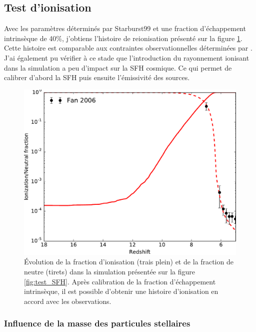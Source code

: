 \clearpage

\subsection{Test d'ionisation}
Avec les paramètres déterminés par Starburst99 et une fraction d'échappement intrinsèque de 40\%, j'obtiens l'histoire de reionisation présenté sur la figure \ref{fig:test_xion}.
Cette histoire est comparable aux contraintes observationnelles déterminées par \cite{fan_constraining_2006}.
J'ai également pu vérifier à ce stade que l'introduction du rayonnement ionisant dans la simulation a peu d'impact sur la \ac{SFH} cosmique.
Ce qui permet de calibrer d'abord la \ac{SFH} puis ensuite l'émissivité des sources.

\begin{figure}
        \includegraphics[width=.95\linewidth]{img/02/xion.pdf} 
        \caption[Histoire d'ionisation]{Évolution de la fraction d'ionisation (trais plein) et de la fraction de neutre (tirets) dans la simulation présentée sur la figure \ref{fig:test_SFH}.
        Après calibration de la fraction d’échappement intrinsèque, il est possible d'obtenir une histoire d'ionisation en accord avec les observations.
 		\label{fig:test_xion}}
\end{figure}

\subsubsection{Influence de la masse des particules stellaires}


